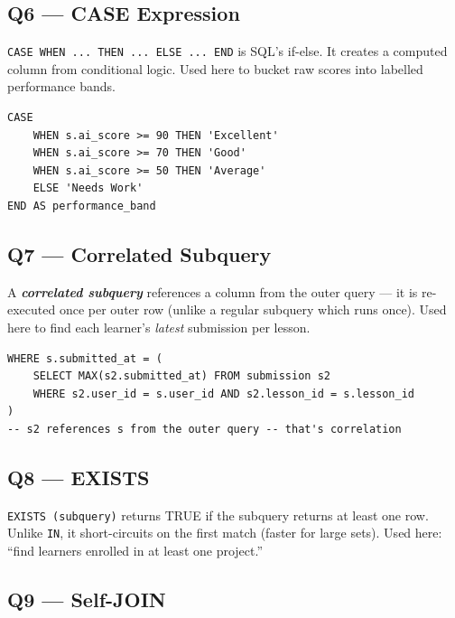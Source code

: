 \documentclass[11pt,a4paper]{article}
\newcommand{\term}[1]{\textbf{\textit{#1}}}
\newcommand{\T}[1]{\texttt{#1}}          %
\begin{document}
\subsection{Q6 — CASE Expression}

\begin{defbox}
\T{CASE WHEN ... THEN ... ELSE ... END} is SQL's if-else. It creates a computed column
from conditional logic. Used here to bucket raw scores into labelled performance bands.
\end{defbox}

\begin{lstlisting}[style=sql]
CASE
    WHEN s.ai_score >= 90 THEN 'Excellent'
    WHEN s.ai_score >= 70 THEN 'Good'
    WHEN s.ai_score >= 50 THEN 'Average'
    ELSE 'Needs Work'
END AS performance_band
\end{lstlisting}

\subsection{Q7 — Correlated Subquery}

\begin{defbox}
A \term{correlated subquery} references a column from the outer query — it is
re-executed once per outer row (unlike a regular subquery which runs once).
Used here to find each learner's \textit{latest} submission per lesson.
\end{defbox}

\begin{lstlisting}[style=sql]
WHERE s.submitted_at = (
    SELECT MAX(s2.submitted_at) FROM submission s2
    WHERE s2.user_id = s.user_id AND s2.lesson_id = s.lesson_id
)
-- s2 references s from the outer query -- that's correlation
\end{lstlisting}

\subsection{Q8 — EXISTS}

\begin{defbox}
\T{EXISTS (subquery)} returns TRUE if the subquery returns at least one row.
Unlike \T{IN}, it short-circuits on the first match (faster for large sets).
Used here: ``find learners enrolled in at least one project.''
\end{defbox}

\subsection{Q9 — Self-JOIN}
\end{document}
